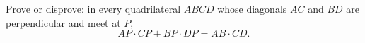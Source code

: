 Prove or disprove: in every quadrilateral $ABCD$ whose diagonals $AC$ and $BD$ are perpendicular and meet at $P$,
\[
AP\cdot CP+BP\cdot DP=AB\cdot CD .
\]
